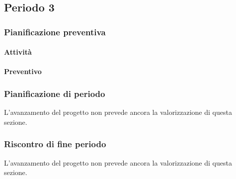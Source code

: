 \subsection{Periodo 3}

\subsubsection{Pianificazione preventiva}

\paragraph{Attività}

\planningTable{
	
}

\paragraph{Preventivo}

\smallPreventivoTable{
	
}


\subsubsection{Pianificazione di periodo}


L'avanzamento del progetto non prevede ancora la valorizzazione di questa sezione.



\subsubsection{Riscontro di fine periodo}


L'avanzamento del progetto non prevede ancora la valorizzazione di questa sezione.
